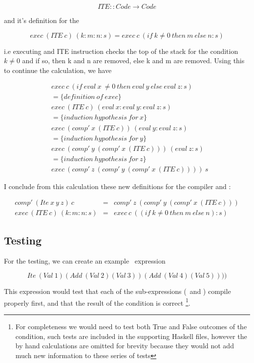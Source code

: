 \documentclass {article}
\begin{document}
	\[ ITE :: Code \rightarrow Code \]

and it's definition for the \vm

	\[ exec\ (ITE\ c)\ (k:m:n:s) 
		= exec\ c\ (if\ k \not= 0\ then\ m\ else\ n:s) \]

i.e executing and ITE instruction
checks the top of the stack for the condition $k \not= 0$
and if so, then k and n are removed,
else k and m are removed.
Using this to continue the calculation, we have

\begin{align*}
	&exec\ c\ (if\ eval\ x\ \not= 0\ then\ eval\ y\ else\ eval\ z :s) \\
	&= \{definition\ of\ exec\} \\
	&exec\ (ITE\ c)\ (eval\ x:eval\ y:eval\ z:s) \\
	&= \{induction\ hypothesis\ for\ x\} \\
	&exec\ (comp'\ x\ (ITE\ c))\ (eval\ y:eval\ z:s) \\
	&= \{induction\ hypothesis\ for\ y\} \\
	&exec\ (comp'\ y\ (comp'\ x\ (ITE\ c)))\ (eval\ z:s) \\
	&= \{induction\ hypothesis\ for\ z\} \\
	&exec\ (comp'\ z\ (comp'\ y\ (comp'\ x\ (ITE\ c))))\ s
\end{align*}

I conclude from this calculation these new definitions
for the compiler and \vm: 

\begin{eqnarray}
	comp'\ (Ite\ x\ y\ z)\ c &=&  comp'\ z\ (comp'\ y\ (comp'\ x\ (ITE\ c))) \label{compite}\\
	exec\ (ITE\ c)\ (k:m:n:s) &=& exec\ c\ ((if\ k \not= 0\ then\ m\ else\ n):s) \label{execite}
\end{eqnarray}

\subsection{Testing}

For the testing, we can create an example \ite\ expression

	\[Ite\ (Val\ 1) (Add\ (Val\ 2) (Val\ 3)) (Add\ (Val\ 4) (Val\ 5)))) \]

This expression would test that
each of the sub-expressions 
(\add\ and \val) compile properly first, 
and that the result of the condition is correct
\footnote{
For completeness we would need to 
test both True and False outcomes of the condition,
such tests are included in the supporting Haskell files, 
however the by hand calculations are omitted
for brevity because they would not add much new
information to these series of tests}.
\end{document}

